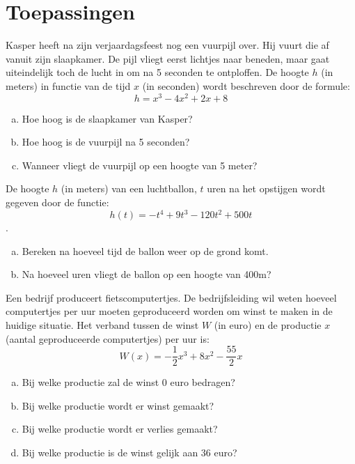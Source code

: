 \documentclass[12pt,twoside,a4paper]{article}
\begin{document}
\cleardoublepage
\section{Toepassingen}

\begin{oefening}
Kasper heeft na zijn verjaardagsfeest nog een vuurpijl over. Hij vuurt die af vanuit zijn slaapkamer. De pijl vliegt eerst lichtjes naar beneden, maar gaat uiteindelijk toch de lucht in om na 5 seconden te ontploffen. De hoogte $h$ (in meters) in functie van de tijd $x$ (in seconden) wordt beschreven door de formule:
$$h=x^3-4x^2+2x+8$$
\begin{enumerate}[(a)]
  \item Hoe hoog is de slaapkamer van Kasper?
  \item Hoe hoog is de vuurpijl na 5 seconden?
  \item Wanneer vliegt de vuurpijl op een hoogte van 5 meter?
\end{enumerate}
\end{oefening}

\begin{oefening}
De hoogte $h$ (in meters) van een luchtballon, $t$ uren na het opstijgen wordt gegeven door de functie:
$$h(t)=-t^4+9t^3-120t^2+500t$$.
\begin{enumerate}[(a)]
  \item Bereken na hoeveel tijd de ballon weer op de grond komt.
  \item Na hoeveel uren vliegt de ballon op een hoogte van 400m?
\end{enumerate}
\end{oefening}

\begin{oefening}
Een bedrijf produceert fietscomputertjes. De bedrijfsleiding wil weten hoeveel computertjes per uur moeten geproduceerd worden om winst te maken in de huidige situatie. Het verband tussen de winst $W$ (in euro) en de productie $x$ (aantal geproduceerde computertjes) per uur is:
$$W(x)=-\dfrac{1}{2}x^3+8x^2-\dfrac{55}{2}x$$
\begin{enumerate}[(a)]
  \item Bij welke productie zal de winst 0 euro bedragen?
  \item Bij welke productie wordt er winst gemaakt?
  \item Bij welke productie wordt er verlies gemaakt?
  \item Bij welke productie is de winst gelijk aan 36 euro?
\end{enumerate}
\end{oefening}
\end{document}
